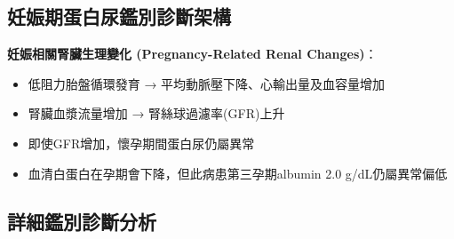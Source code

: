 \documentclass[12pt,a4paper]{article}
\begin{document}
\subsection{妊娠期蛋白尿鑑別診斷架構}

\begin{importantbox}
\textbf{妊娠相關腎臟生理變化 (Pregnancy-Related Renal Changes)}：
\begin{itemize}[leftmargin=*]
    \item 低阻力胎盤循環發育 → 平均動脈壓下降、心輸出量及血容量增加
    \item 腎臟血漿流量增加 → 腎絲球過濾率(GFR)上升
    \item 即使GFR增加，懷孕期間蛋白尿仍屬異常
    \item 血清白蛋白在孕期會下降，但此病患第三孕期albumin 2.0 g/dL仍屬異常偏低
\end{itemize}
\end{importantbox}

\subsection{詳細鑑別診斷分析}
\end{document}

